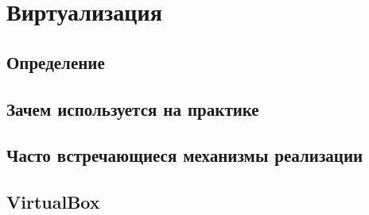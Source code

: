 \section{Виртуализация}
\subsection{Определение}
\subsection{Зачем используется на практике}
\subsection{Часто встречающиеся механизмы реализации}
\subsection{VirtualBox}
\newpage
